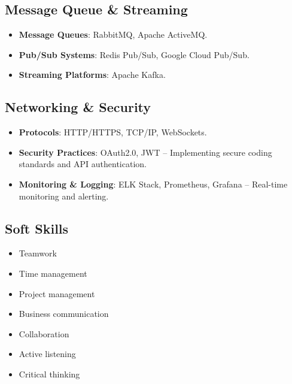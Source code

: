 \begin{cventries}
\begin{row}[cellsep=0.75cm]{1}{1}
    \begin{cell}{1}
	\section*{Message Queue \& Streaming}
	\vspace{-1.5ex}
    \begin{itemize} 
        \item {\textbf{Message Queues}: RabbitMQ, Apache ActiveMQ.}
        \item {\textbf{Pub/Sub Systems}: Redis Pub/Sub, Google Cloud Pub/Sub.}
        \item {\textbf{Streaming Platforms}: Apache Kafka.}
    \end{itemize}
	\end{cell}
\end{row}

\begin{row}[cellsep=0.75cm]{1}{1}
    \begin{cell}{1}
	\section*{Networking \& Security}
	\vspace{-1.5ex}
    \begin{itemize} 
        \item {\textbf{Protocols}: HTTP/HTTPS, TCP/IP, WebSockets.}
        \item {\textbf{Security Practices}: OAuth2.0, JWT – Implementing secure coding standards and API authentication.}
        \item {\textbf{Monitoring \& Logging}: ELK Stack, Prometheus, Grafana – Real-time monitoring and alerting.}
    \end{itemize}
	\end{cell}
\end{row}

\begin{row}[cellsep=0.75cm]{1}{1}
    \begin{cell}{1}
	\section*{Soft Skills}
	\vspace{-1.5ex}
    \begin{itemize} 
        \item {Teamwork}
        \item {Time management}
        \item {Project management}
        \item {Business communication}
        \item {Collaboration}
        \item {Active listening}
        \item {Critical thinking}
    \end{itemize}
	\end{cell}
\end{row}


\end{cventries}
